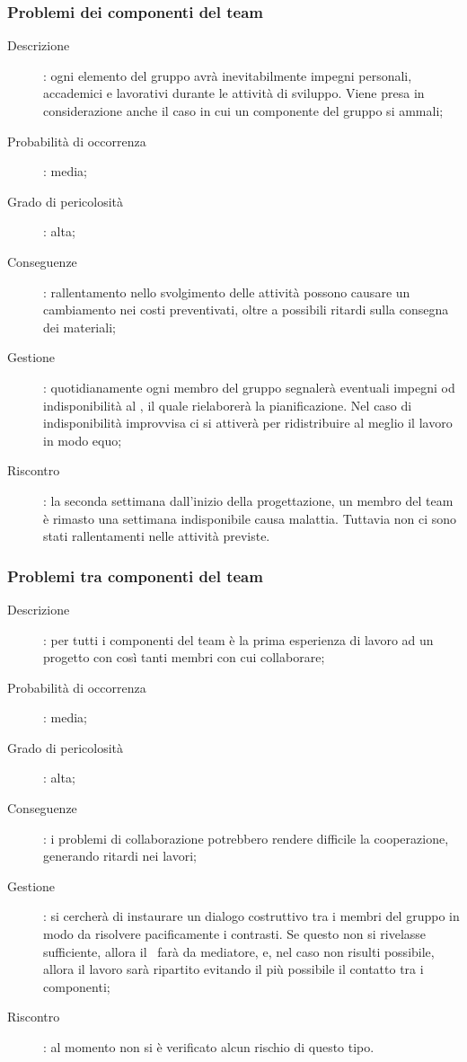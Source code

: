\documentclass[../PianoDiProgetto.tex]{subfiles}
\begin{document}
		\subsubsection{Problemi dei componenti del team}
		\begin{description}
		\item [Descrizione]: ogni elemento del gruppo avrà inevitabilmente impegni personali, accademici e lavorativi durante le attività di sviluppo. Viene presa in considerazione anche il caso in cui un componente del gruppo si ammali;
		\item [Probabilità di occorrenza]: media;
		\item [Grado di pericolosità]: alta; 
		\item [Conseguenze]: rallentamento nello svolgimento delle attività possono causare un cambiamento nei costi preventivati, oltre a possibili ritardi sulla consegna dei materiali;
		\item [Gestione]: quotidianamente ogni membro del gruppo segnalerà eventuali impegni od indisponibilità al \responsabilediprogetto, il quale rielaborerà la pianificazione. Nel caso di indisponibilità improvvisa ci si attiverà per ridistribuire al meglio il lavoro in modo equo;
		\item [Riscontro]: la seconda settimana dall'inizio della progettazione, un membro del team è rimasto una settimana indisponibile causa malattia. Tuttavia non ci sono stati rallentamenti nelle attività previste.
		\end{description}

		\subsubsection{Problemi tra componenti del team}
		\begin{description}
		\item [Descrizione]: per tutti i componenti del team è la prima esperienza di lavoro ad un progetto con così tanti membri con cui collaborare;
		\item [Probabilità di occorrenza]: media;
		\item [Grado di pericolosità]: alta; 
		\item [Conseguenze]: i problemi di collaborazione potrebbero rendere difficile la cooperazione, generando ritardi nei lavori;
		\item [Gestione]: si cercherà di instaurare un dialogo costruttivo tra i membri del gruppo in modo da risolvere pacificamente i contrasti. Se questo non si rivelasse sufficiente, allora il \responsabilediprogetto\ farà da mediatore, e, nel caso non risulti possibile, allora il lavoro sarà ripartito evitando il più possibile il contatto tra i componenti;
		\item [Riscontro]: al momento non si è verificato alcun rischio di questo tipo.
		\end{description}
\end{document}
